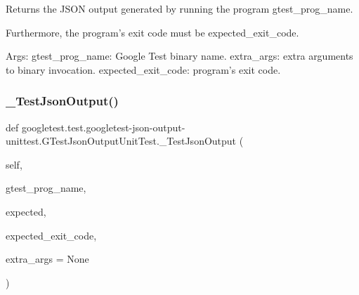 \begin{DoxyVerb}Returns the JSON output generated by running the program gtest_prog_name.

Furthermore, the program's exit code must be expected_exit_code.

Args:
  gtest_prog_name: Google Test binary name.
  extra_args: extra arguments to binary invocation.
  expected_exit_code: program's exit code.
\end{DoxyVerb}
 \mbox{\label{classgoogletest_1_1test_1_1googletest-json-output-unittest_1_1_g_test_json_output_unit_test_aad176abc66069eb18acf11dd9fa9c3b8}} 
\subsubsection{\texorpdfstring{\_TestJsonOutput()}{\_TestJsonOutput()}}
{\footnotesize\ttfamily def googletest.\+test.\+googletest-\/json-\/output-\/unittest.\+G\+Test\+Json\+Output\+Unit\+Test.\+\_\+\+Test\+Json\+Output (\begin{DoxyParamCaption}\item[{}]{self,  }\item[{}]{gtest\+\_\+prog\+\_\+name,  }\item[{}]{expected,  }\item[{}]{expected\+\_\+exit\+\_\+code,  }\item[{}]{extra\+\_\+args = {\ttfamily None} }\end{DoxyParamCaption})\hspace{0.3cm}{\ttfamily [private]}}

